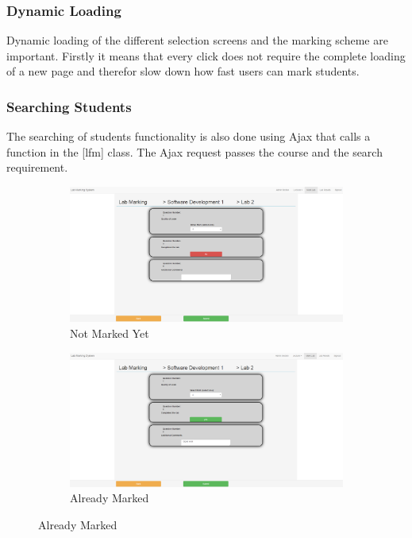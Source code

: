 \documentclass[12pt]{article}  %
\begin{document}
\subsubsection{Dynamic Loading}

Dynamic loading of the different selection screens and the marking scheme are important. Firstly it means that every click does not require the complete loading of a new page and therefor slow down how fast users can mark students.




\subsubsection{Searching Students}
The searching of students functionality is also done using Ajax that calls a function in the [lfm] class. The Ajax request passes the course and the search requirement. 

\begin{figure}[H]
\caption{Marking Student Page}
\centering
\begin{subfigure}[c]{0.45\textwidth}
    \includegraphics[width=1\textwidth]{images/implementation/marking-5-page.png}
    \caption{Not Marked Yet}
    \label{fig:marking-not}
\end{subfigure}
\hfill
\begin{subfigure}[c]{0.45\textwidth}
    \includegraphics[width=1\textwidth]{images/implementation/marking-6-page.png}
    \caption{Already Marked}
    \label{fig:marking-already}
\end{subfigure}

\end{figure}
\end{document}
